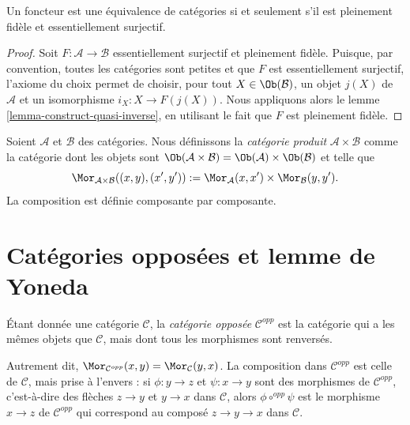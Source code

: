 \begin{lemma}
\label{lemma-equivalence-categories}
Un foncteur est une équivalence de catégories si et seulement s'il est
pleinement fidèle et essentiellement surjectif.
\end{lemma}

\begin{proof}
Soit $F : \mathcal{A} \to \mathcal{B}$ essentiellement surjectif et pleinement
fidèle. Puisque, par convention, toutes les catégories sont petites et que
$F$ est essentiellement surjectif, l'axiome du choix permet de choisir, pour
tout $X \in \Ob(\mathcal{B})$, un objet $j(X)$ de $\mathcal{A}$ et un
isomorphisme $i_X : X \to F(j(X))$. Nous appliquons alors le
lemme \ref{lemma-construct-quasi-inverse},
en utilisant le fait que $F$ est pleinement fidèle.
\end{proof}

\begin{definition}
\label{definition-product-category}
Soient $\mathcal{A}$ et $\mathcal{B}$ des catégories.
Nous définissons la {\it catégorie produit}
$\mathcal{A} \times \mathcal{B}$ comme la catégorie dont les objets sont
$\Ob(\mathcal{A} \times \mathcal{B}) =
\Ob(\mathcal{A}) \times \Ob(\mathcal{B})$
et telle que
$$
\Mor_{\mathcal{A} \times \mathcal{B}}((x, y), (x', y'))
:=
\Mor_\mathcal{A}(x, x')\times
\Mor_\mathcal{B}(y, y').
$$
La composition est définie composante par composante.
\end{definition}


\section{Catégories opposées et lemme de Yoneda}
\label{section-opposite}

\begin{definition}
\label{definition-opposite}
Étant donnée une catégorie $\mathcal{C}$, la {\it catégorie opposée}
$\mathcal{C}^{opp}$ est la catégorie qui a les mêmes objets
que $\mathcal{C}$, mais dont tous les morphismes sont renversés.
\end{definition}

\noindent
Autrement dit,
$\Mor_{\mathcal{C}^{opp}}(x, y) = \Mor_\mathcal{C}(y, x)$.
La composition dans $\mathcal{C}^{opp}$ est celle de $\mathcal{C}$,
mais prise à l'envers : si $\phi : y \to z$ et $\psi : x \to y$
sont des morphismes de $\mathcal{C}^{opp}$, c'est-à-dire des flèches
$z \to y$ et $y \to x$ dans $\mathcal{C}$,
alors $\phi \circ^{opp} \psi$ est le morphisme $x \to z$
de $\mathcal{C}^{opp}$ qui correspond au composé
$z \to y \to x$ dans $\mathcal{C}$.

